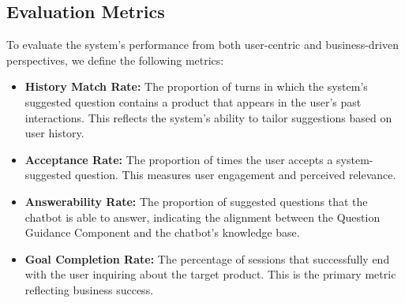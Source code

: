 
\subsection{Evaluation Metrics}

To evaluate the system's performance from both user-centric and business-driven perspectives, we define the following metrics:

\begin{itemize}
    \item \textbf{History Match Rate:}  
    The proportion of turns in which the system’s suggested question contains a product that appears in the user's past interactions.
    This reflects the system's ability to tailor suggestions based on user history.
    
    \item \textbf{Acceptance Rate:}  
    The proportion of times the user accepts a system-suggested question. This measures user engagement and perceived relevance.
    
    \item \textbf{Answerability Rate:}  
    The proportion of suggested questions that the chatbot is able to answer, indicating the alignment between the Question Guidance Component and the chatbot's knowledge base.
    
    \item \textbf{Goal Completion Rate:}  
    The percentage of sessions that successfully end with the user inquiring about the target product. This is the primary metric reflecting business success.
\end{itemize}


